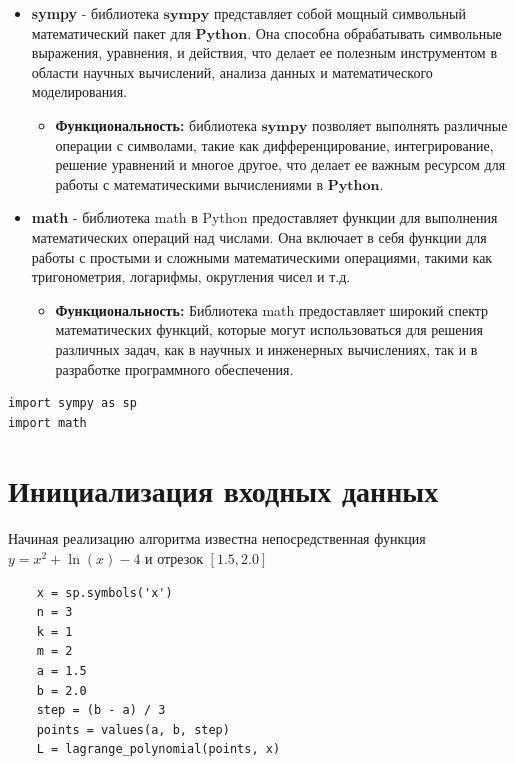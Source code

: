 \documentclass{article}
\begin{document}
\begin{itemize}
    \item \textbf{sympy} - библиотека $\textbf{sympy}$ представляет собой мощный символьный математический пакет для $\textbf{Python}$. Она способна обрабатывать символьные выражения, уравнения, и действия, что делает ее полезным инструментом в области научных вычислений, анализа данных и математического моделирования.
    \begin{itemize}
        \item \textbf{Функциональность:} библиотека $\textbf{sympy}$ позволяет выполнять различные операции с символами, такие как дифференцирование, интегрирование, решение уравнений и многое другое, что делает ее важным ресурсом для работы с математическими вычислениями в $\textbf{Python}$.
    \end{itemize}
\end{itemize}
\begin{itemize} \item \textbf{math} - библиотека 
math
 в Python предоставляет функции для выполнения математических операций над числами. Она включает в себя функции для работы с простыми и сложными математическими операциями, такими как тригонометрия, логарифмы, округления чисел и т.д. \begin{itemize} \item \textbf{Функциональность:} Библиотека 
math
 предоставляет широкий спектр математических функций, которые могут использоваться для решения различных задач, как в научных и инженерных вычислениях, так и в разработке программного обеспечения. 
 \end{itemize} 
 \end{itemize}

\begin{lstlisting}
import sympy as sp
import math
\end{lstlisting}


\section{Инициализация входных данных}
Начиная реализацию алгоритма известна непосредственная функция$y=x^2 + \ln(x) - 4$ и отрезок $[1.5,2.0]$ \

\begin{lstlisting}
    x = sp.symbols('x')
    n = 3
    k = 1
    m = 2
    a = 1.5
    b = 2.0
    step = (b - a) / 3
    points = values(a, b, step)
    L = lagrange_polynomial(points, x)
\end{lstlisting}
\end{document}
